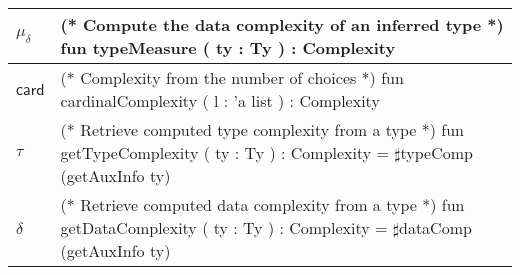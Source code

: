 \begin{longtable}{||l|l||}
$\mu_\delta$ &
\parbox[t]{9cm}{
\scriptsize
(* Compute the data complexity of an inferred type *)\linebreak    
fun typeMeasure ( ty : Ty ) : Complexity
\normalsize
\vspace{0.5mm}} \\\hline

$\mathsf{card}$ &
\parbox[t]{9cm}{
\scriptsize
(* Complexity from the number of choices *)\linebreak
fun cardinalComplexity ( l : 'a list ) : Complexity
\normalsize
\vspace{0.5mm}} \\\hline

$\tau$ &
\parbox[t]{9cm}{
\scriptsize
(* Retrieve computed type complexity from a type *)\linebreak
fun getTypeComplexity ( ty : Ty ) : Complexity = $\sharp$typeComp (getAuxInfo ty)
\normalsize
\vspace{0.5mm}} \\\hline

$\delta$ &
\parbox[t]{9cm}{
\scriptsize
(* Retrieve computed data complexity from a type *)\linebreak
fun getDataComplexity ( ty : Ty ) : Complexity = $\sharp$dataComp (getAuxInfo ty)
\normalsize
\vspace{0.5mm}} \\\hline

\end{longtable}

\normalsize

